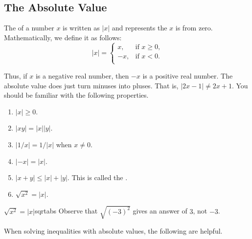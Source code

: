 \subsection{The Absolute Value}
The  of a number $x$ is written as $|x|$ and represents 
the  $x$ is from zero. Mathematically, we define it as follows:
$$|x|=\left\{\begin{array}{cl}
x, & \mbox{if $x\geq 0$,}\\
-x, & \mbox{if $x<0$.}\\
\end{array}\right.$$

Thus, if $x$ is a negative real number, then $-x$ is a positive real number.
The absolute value does  just turn minuses into pluses.
That is, $|2x-1|\neq 2x+1$.
You should be familiar with the following properties.\\

\begin{formulabox}
\begin{enumerate}
	\item $|x|\geq 0$.
	\item $|xy|=|x||y|$.
	\item $|1/x|=1/|x|$ when $x\neq 0$.
	\item $|-x|=|x|$.
	\item $|x+y|\leq |x|+|y|$. This is called the .
	\item $\sqrt{x^2}=|x|$.
\end{enumerate}
\end{formulabox}

\begin{example}{$\sqrt{x^2}=|x|$}{sqrtabs}
Observe that $\sqrt{(-3)^2}$ gives an answer of $3$, not $-3$.
\end{example}

When solving inequalities with absolute values, the following are helpful. %
%
 

